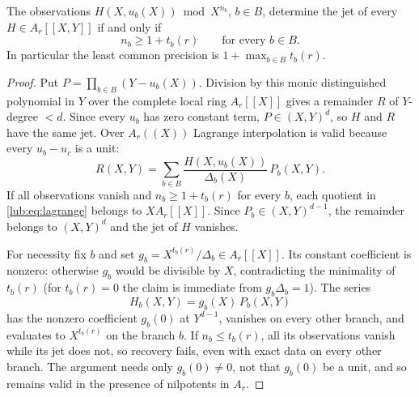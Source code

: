 \begin{proposition}\label{lub:prop:threshold}
The observations $H(X,u_b(X))\bmod X^{n_b}$, $b\in B$, determine the jet of every
$H\in A_r[[X,Y]]$ if and only if
\[
 n_b\ge1+t_b(r)\qquad\text{for every }b\in B.
\]
In particular the least common precision is $1+\max_{b\in B}t_b(r)$.
\end{proposition}
\begin{proof}
Put $P=\prod_{b\in B}(Y-u_b(X))$. Division by this monic distinguished polynomial in $Y$
over the complete local ring $A_r[[X]]$ gives a remainder $R$ of $Y$-degree $<d$. Since
every $u_b$ has zero constant term, $P\in(X,Y)^d$, so $H$ and $R$ have the same jet. Over
$A_r((X))$ Lagrange interpolation is valid because every $u_b-u_c$ is a unit:
\begin{equation}\label{lub:eq:lagrange}
 R(X,Y)=\sum_{b\in B}\frac{H(X,u_b(X))}{\Delta_b(X)}\,P_b(X,Y).
\end{equation}
If all observations vanish and $n_b\ge1+t_b(r)$ for every $b$, each quotient in
\eqref{lub:eq:lagrange} belongs to $XA_r[[X]]$. Since $P_b\in(X,Y)^{d-1}$, the remainder
belongs to $(X,Y)^d$ and the jet of $H$ vanishes.

For necessity fix $b$ and set $g_b=X^{t_b(r)}/\Delta_b\in A_r[[X]]$. Its constant
coefficient is nonzero: otherwise $g_b$ would be divisible by $X$, contradicting the
minimality of $t_b(r)$ (for $t_b(r)=0$ the claim is immediate from $g_b\Delta_b=1$). The
series
\[
 H_b(X,Y)=g_b(X)\,P_b(X,Y)
\]
has the nonzero coefficient $g_b(0)$ at $Y^{d-1}$, vanishes on every other branch, and
evaluates to $X^{t_b(r)}$ on the branch $b$. If $n_b\le t_b(r)$, all its observations
vanish while its jet does not, so recovery fails, even with exact data on every other
branch. The argument needs only $g_b(0)\ne0$, not that $g_b(0)$ be a unit, and so remains
valid in the presence of nilpotents in $A_r$.
\end{proof}

